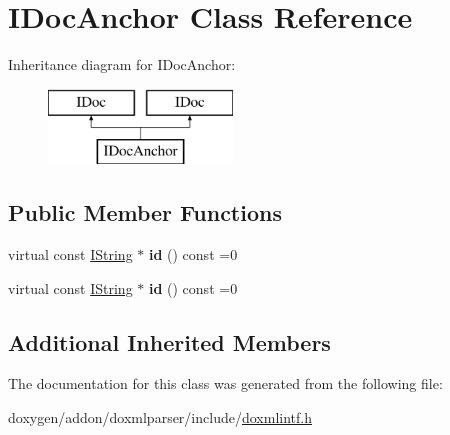 \hypertarget{class_i_doc_anchor}{}\section{I\+Doc\+Anchor Class Reference}
\label{class_i_doc_anchor}
Inheritance diagram for I\+Doc\+Anchor\+:\begin{figure}[H]
\begin{center}
\leavevmode
\includegraphics[height=2.000000cm]{class_i_doc_anchor}
\end{center}
\end{figure}
\subsection*{Public Member Functions}
\begin{DoxyCompactItemize}
\item 
\mbox{\label{class_i_doc_anchor_a4d6e54a9c4d811ad94b7fa176ec30fff}} 
virtual const \mbox{\hyperlink{class_i_string}{I\+String}} $\ast$ {\bfseries id} () const =0
\item 
\mbox{\label{class_i_doc_anchor_a4d6e54a9c4d811ad94b7fa176ec30fff}} 
virtual const \mbox{\hyperlink{class_i_string}{I\+String}} $\ast$ {\bfseries id} () const =0
\end{DoxyCompactItemize}
\subsection*{Additional Inherited Members}


The documentation for this class was generated from the following file\+:\begin{DoxyCompactItemize}
\item 
doxygen/addon/doxmlparser/include/\mbox{\hyperlink{include_2doxmlintf_8h}{doxmlintf.\+h}}\end{DoxyCompactItemize}
